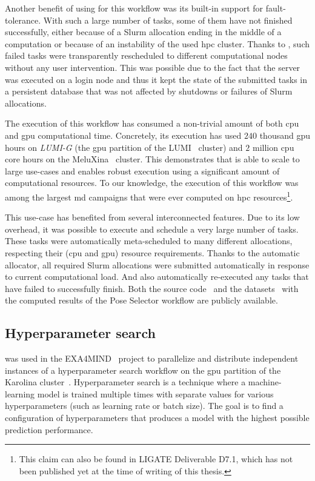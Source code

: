 Another benefit of using \hyperqueue{} for this workflow was its built-in support for
fault-tolerance. With such a large number of tasks, some of them have not finished successfully,
either because of a Slurm allocation ending in the middle of a computation or because of an
instability of the used \gls{hpc} cluster. Thanks to \hyperqueue{}, such
failed tasks were transparently rescheduled to different computational nodes without any user
intervention. This was possible due to the fact that the \hq{} server was
executed on a login node and thus it kept the state of the submitted tasks in a persistent database
that was not affected by shutdowns or failures of Slurm allocations.

The execution of this workflow has consumed a non-trivial amount of both \gls{cpu}
and \gls{gpu} computational time. Concretely, its execution has used
$240$ thousand \gls{gpu} hours on \emph{LUMI-G}
(the \gls{gpu} partition of the LUMI~\cite{lumi} cluster) and
$2$ million \gls{cpu} core hours on the
MeluXina~\cite{meluxina} cluster. This demonstrates that \hyperqueue{} is able to
scale to large use-cases and enables robust execution using a significant amount of computational
resources. To our knowledge, the execution of this workflow was among the largest
\gls{md} campaigns that were ever computed on \gls{hpc}
resources\footnote{This claim can also be found in LIGATE Deliverable D7.1, which has not been published yet at the time of writing of this thesis.}.

This use-case has benefited from several interconnected \hyperqueue{} features. Due to
its low overhead, it was possible to execute and schedule a very large number of tasks. These tasks
were automatically meta-scheduled to many different allocations, respecting their
(\gls{cpu} and \gls{gpu}) resource requirements. Thanks to the
automatic allocator, all required Slurm allocations were submitted automatically in response to
current computational load. And \hyperqueue{} also automatically re-executed any tasks
that have failed to successfully finish. Both the source code~\cite{ps-workflow} and the
datasets~\cite{ps_dataset_1,ps_dataset_2} with the computed results of the Pose Selector workflow are
publicly available.

\subsection{Hyperparameter search}
\hyperqueue{} was used in the EXA4MIND~\cite{exa4mind} project to parallelize and
distribute independent instances of a hyperparameter search workflow on the \gls{gpu}
partition of the Karolina cluster~\cite{karolina}. Hyperparameter search is a technique
where a machine-learning model is trained multiple times with separate values for various
hyperparameters (such as learning rate or batch size). The goal is to find a configuration of
hyperparameters that produces a model with the highest possible prediction performance.

